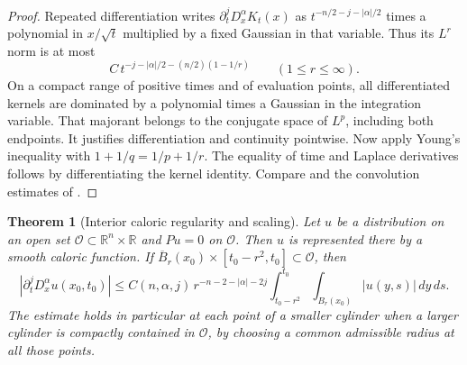 \documentclass[11pt,oneside,openany]{book}
\theoremstyle{plain}
\newtheorem{theorem}{Theorem}[chapter]
\theoremstyle{definition}
\theoremstyle{remark}
\begin{document}
\begin{proof}
Repeated differentiation writes
\(\partial_t^jD_x^\alpha K_t(x)\) as
\(t^{-n/2-j-|\alpha|/2}\) times a polynomial in \(x/\sqrt t\)
multiplied by a fixed Gaussian in that variable.
Thus its \(L^r\) norm is at most
\[
 C\,t^{-j-|\alpha|/2-(n/2)(1-1/r)}\qquad(1\leq r\leq\infty).
\]
On a compact range of positive times and of evaluation points, all
differentiated kernels are dominated by a polynomial times a
Gaussian in the integration variable. That majorant belongs to
the conjugate space of \(L^p\), including both endpoints.
It justifies differentiation and continuity pointwise.
Now apply Young's inequality with \(1+1/q=1/p+1/r\).
The equality of time and Laplace derivatives follows by differentiating
the kernel identity. Compare \cite[\S\S 2.3.1 and 2.3.3]{Evans}
and the convolution estimates of \cite[Unit U2]{P102}.
\end{proof}

\begin{theorem}[Interior caloric regularity and scaling]
\label{pde:heat-local}
Let \(u\) be a distribution on an open set \(\mathcal O\subset\mathbb
R^n\times\mathbb R\) and \(Pu=0\) on \(\mathcal O\). Then \(u\) is
represented there by a smooth caloric function. If
\(\overline B_r(x_0)\times[t_0-r^2,t_0]\subset\mathcal O\), then
\[
 |\partial_t^j D_x^\alpha u(x_0,t_0)|
 \leq C(n,\alpha,j)\,r^{-n-2-|\alpha|-2j}
       \int_{t_0-r^2}^{t_0}\int_{B_r(x_0)} |u(y,s)|\,dy\,ds .
\]
The estimate holds in particular at each point of a smaller cylinder
when a larger cylinder is compactly contained in \(\mathcal O\),
by choosing a common admissible radius at all those points.
\end{theorem}
\end{document}
